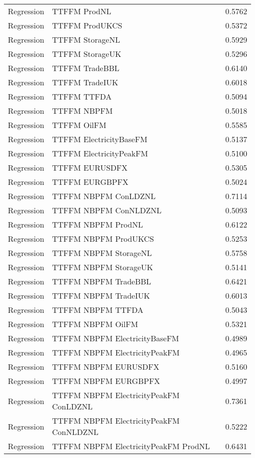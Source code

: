 \begin{table}[h!]
\begin{adjustbox}{max width=\textwidth}
\begin{tabular}{llr}
  Regression & TTFFM ProdNL & 0.5762 \\ 
  Regression & TTFFM ProdUKCS & 0.5372 \\ 
  Regression & TTFFM StorageNL & 0.5929 \\ 
  Regression & TTFFM StorageUK & 0.5296 \\ 
  Regression & TTFFM TradeBBL & 0.6140 \\ 
  Regression & TTFFM TradeIUK & 0.6018 \\ 
  Regression & TTFFM TTFDA & 0.5094 \\ 
  Regression & TTFFM NBPFM & 0.5018 \\ 
  Regression & TTFFM OilFM & 0.5585 \\ 
  Regression & TTFFM ElectricityBaseFM & 0.5137 \\ 
  Regression & TTFFM ElectricityPeakFM & 0.5100 \\ 
  Regression & TTFFM EURUSDFX & 0.5305 \\ 
  Regression & TTFFM EURGBPFX & 0.5024 \\ 
  Regression & TTFFM NBPFM ConLDZNL & 0.7114 \\ 
  Regression & TTFFM NBPFM ConNLDZNL & 0.5093 \\ 
  Regression & TTFFM NBPFM ProdNL & 0.6122 \\ 
  Regression & TTFFM NBPFM ProdUKCS & 0.5253 \\ 
  Regression & TTFFM NBPFM StorageNL & 0.5758 \\ 
  Regression & TTFFM NBPFM StorageUK & 0.5141 \\ 
  Regression & TTFFM NBPFM TradeBBL & 0.6421 \\ 
  Regression & TTFFM NBPFM TradeIUK & 0.6013 \\ 
  Regression & TTFFM NBPFM TTFDA & 0.5043 \\ 
  Regression & TTFFM NBPFM OilFM & 0.5321 \\ 
  Regression & TTFFM NBPFM ElectricityBaseFM & 0.4989 \\ 
  Regression & TTFFM NBPFM ElectricityPeakFM & 0.4965 \\ 
  Regression & TTFFM NBPFM EURUSDFX & 0.5160 \\ 
  Regression & TTFFM NBPFM EURGBPFX & 0.4997 \\ 
  Regression & TTFFM NBPFM ElectricityPeakFM ConLDZNL & 0.7361 \\ 
  Regression & TTFFM NBPFM ElectricityPeakFM ConNLDZNL & 0.5222 \\ 
  Regression & TTFFM NBPFM ElectricityPeakFM ProdNL & 0.6431 \\ 

\end{tabular}
\end{adjustbox}
\end{table}
